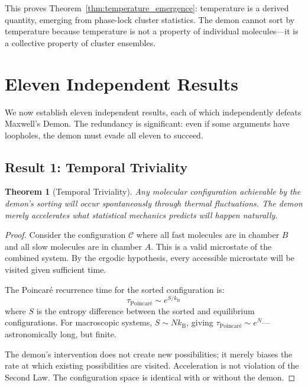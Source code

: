 \documentclass[twocolumn,showpacs,preprintnumbers,amsmath,amssymb,prd]{revtex4-2}
\newtheorem{theorem}{Theorem}[section]
\theoremstyle{definition}
\theoremstyle{remark}
\newcommand{\kB}{k_{\mathrm{B}}}
\begin{document}
This proves Theorem~\ref{thm:temperature_emergence}: temperature is a derived quantity, emerging from phase-lock cluster statistics. The demon cannot sort by temperature because temperature is not a property of individual molecules---it is a collective property of cluster ensembles.

\section{Eleven Independent Results}
\label{sec:eleven_results}

We now establish eleven independent results, each of which independently defeats Maxwell's Demon. The redundancy is significant: even if some arguments have loopholes, the demon must evade all eleven to succeed.

\subsection{Result 1: Temporal Triviality}

\begin{theorem}[Temporal Triviality]
\label{thm:temporal_triviality}
Any molecular configuration achievable by the demon's sorting will occur spontaneously through thermal fluctuations. The demon merely accelerates what statistical mechanics predicts will happen naturally.
\end{theorem}

\begin{proof}
Consider the configuration $\mathcal{C}$ where all fast molecules are in chamber $B$ and all slow molecules are in chamber $A$. This is a valid microstate of the combined system. By the ergodic hypothesis, every accessible microstate will be visited given sufficient time.

The Poincaré recurrence time for the sorted configuration is:
\begin{equation}
\tau_{\text{Poincaré}} \sim e^{S/\kB}
\label{eq:poincare}
\end{equation}
where $S$ is the entropy difference between the sorted and equilibrium configurations. For macroscopic systems, $S \sim N\kB$, giving $\tau_{\text{Poincaré}} \sim e^N$---astronomically long, but finite.

The demon's intervention does not create new possibilities; it merely biases the rate at which existing possibilities are visited. Acceleration is not violation of the Second Law. The configuration space is identical with or without the demon.
\end{proof}
\end{document}
